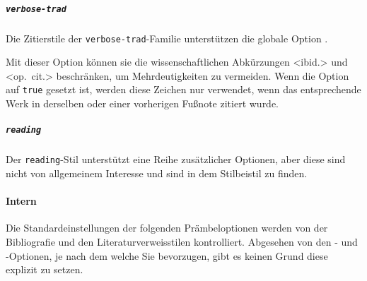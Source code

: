 \documentclass{ltxdockit}[2011/03/25]
\begin{document}
\subparagraph{\texttt{verbose-trad}} Die Zitierstile der \texttt{verbose-trad}-Familie unterstützen die globale Option .

\begin{optionlist}


Mit dieser Option können sie die wissenschaftlichen Abkürzungen <ibid.> und 
<op.~cit.> beschränken, um Mehrdeutigkeiten zu vermeiden. Wenn die Option
auf \texttt{true} gesetzt ist, werden diese Zeichen nur verwendet, wenn das entsprechende Werk in derselben oder einer vorherigen Fußnote zitiert wurde.
\end{optionlist}

\subparagraph{\texttt{reading}} Der  \texttt{reading}-Stil unterstützt eine Reihe zusätzlicher Optionen, aber diese sind nicht von allgemeinem Interesse und sind in dem Stilbeistil zu finden.

\paragraph{Intern} \label{use:opt:pre:int} 

Die Standardeinstellungen der folgenden Prämbeloptionen werden von der
Bibliografie und den Literaturverweisstilen kontrolliert. Abgesehen von den
- und -Optionen, je nach dem welche Sie
bevorzugen, gibt es keinen Grund diese explizit zu setzen.
\end{document}
